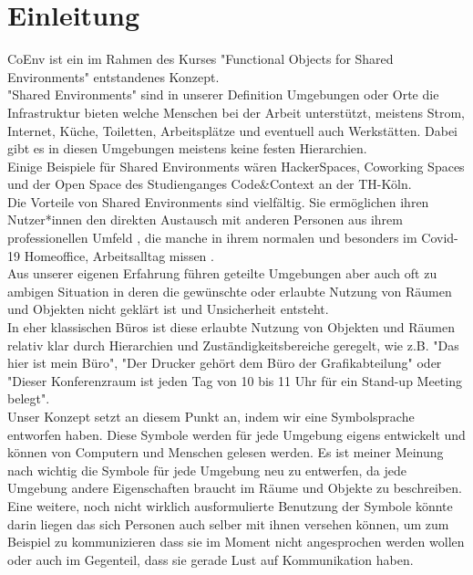 \documentclass{article}
\title{\thetitle}
\author{\theauthor}
\date{\today}
\begin{document}
\maketitle

\begin{abstract}
Das Ziel dieses Textes ist es, unser Produkt CoEnv unter ethischen Gesichtspunkten zu bewerten. CoEnv ist ein modulares Ökosystem aus kleineren Produkten welche das Zusammenarbeiten in geteilten Umgebungen erleichtern sollen.
\end{abstract}

\newpage
\tableofcontents
\newpage

\section{Einleitung}
\begin{multicols}{2}
CoEnv ist ein im Rahmen des Kurses "Functional Objects for Shared Environments" entstandenes Konzept.
\\[2ex]
"Shared Environments" sind in unserer Definition Umgebungen oder Orte die Infrastruktur bieten welche Menschen bei der Arbeit unterstützt, meistens Strom, Internet, Küche, Toiletten, Arbeitsplätze und eventuell auch Werkstätten. Dabei gibt es in diesen Umgebungen meistens keine festen Hierarchien.
\\[2ex]
Einige Beispiele für Shared Environments wären HackerSpaces, Coworking Spaces und der Open Space des Studienganges Code\&Context an der TH-Köln.
\\[2ex]
Die Vorteile von Shared Environments sind vielfältig. Sie ermöglichen ihren Nutzer*innen den direkten Austausch mit anderen Personen aus ihrem professionellen Umfeld \cite{Cabral2016}, die manche in ihrem normalen und besonders im Covid-19 Homeoffice, Arbeitsalltag missen \cite{Lengen2021-xe}.
\\[2ex]
Aus unserer eigenen Erfahrung führen geteilte Umgebungen aber auch oft zu ambigen Situation in deren die gewünschte oder erlaubte Nutzung von Räumen und Objekten nicht geklärt ist und Unsicherheit entsteht.
\\[2ex]
In eher klassischen Büros ist diese erlaubte Nutzung von Objekten und Räumen relativ klar durch Hierarchien und Zuständigkeitsbereiche geregelt, wie z.B. "Das hier ist mein Büro", "Der Drucker gehört dem Büro der Grafikabteilung" oder "Dieser Konferenzraum ist jeden Tag von 10 bis 11 Uhr für ein Stand-up Meeting belegt".
\\[2ex]
Unser Konzept setzt an diesem Punkt an, indem wir eine Symbolsprache entworfen haben. Diese Symbole werden für jede Umgebung eigens entwickelt und können von Computern und Menschen gelesen werden. Es ist meiner Meinung nach wichtig die Symbole für jede Umgebung neu zu entwerfen, da jede Umgebung andere Eigenschaften braucht im Räume und Objekte zu beschreiben.
\\[2ex]
Eine weitere, noch nicht wirklich ausformulierte Benutzung der Symbole könnte darin liegen das sich Personen auch selber mit ihnen versehen können, um zum Beispiel zu kommunizieren dass sie im Moment nicht angesprochen werden wollen oder auch im Gegenteil, dass sie gerade Lust auf Kommunikation haben. 
\end{multicols}
\end{document}
